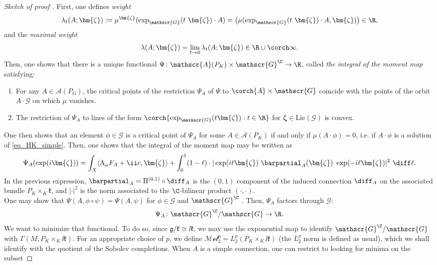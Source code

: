 {\begin{proof}[\textit{Sketch of proof} \parencite{i1999hitchin}]
    First, one defines \textit{weight} 
    \[
    \lambda_t(A; \bm{\zeta}):=\mu^{\bm{\zeta}}(\exp_{\mathscr{G}}(t\  \bm{\zeta})\cdot A)=\big(\mu(\exp_{\mathscr{G}}(t \ \bm{\zeta})\cdot A, \bm{\zeta}) \big) \in \R,
    \]
    and the \textit{maximal weight}
    \[
    \lambda(A; \bm{\zeta})=\lim_{t \to 0} \lambda_t(A; \bm{\zeta}) \in \R \cup \corch\infty.
    \]
    Then, one shows that there is a unique functional \(\Psi\colon \mathscr{A}(P_K) \times \mathscr{G}^\C \to \R\), called \textit{the integral of the moment map} satisfying:
    \begin{enumerate}
        \item For any \(A \in \mathscr{A}(P_G)\), the critical points of the restriction \(\Psi_A\) of \(\Psi\) to \(\corch{A} \times \mathscr{G}\) coincide with the points of the orbit \(A\cdot \mathscr{G}\) on which \(\mu\) vanishes.
        \item The restriction of \(\Psi_A\) to lines of the form \(\corch{\exp_{\mathscr{G}}(t\bm{\zeta}): t \in \R}\) for \(\bm{\zeta} \in \mathrm{Lie}(\mathscr{G})\) is convex.
    \end{enumerate}
    One then shows that an element \(\phi \in \mathscr{G}\) is a critical point of \(\Psi_A\) for some \(A \in \mathscr{A}(P_K)\) if and only if \(\mu(A \cdot \phi)=0\), i.e. if \(A \cdot \phi\) is a solution of \eqref{eq_HK_simple}. Then, one shows that the integral of the moment map may be written as
    \[
    \Psi_A(\exp(i\bm{\zeta}))=\int_X \langle \Lambda_\omega F_A+\ii c, \bm{\zeta}\rangle +\int_0^1(1-\ell)\cdot |\exp(i\ell \bm{\zeta})\ \barpartial_A(\bm{\zeta}) \ \exp(-i \ell \bm{\zeta})|^2 \ \diff \ell. 
    \]
    In the previous expression, \(\barpartial_A=\Pi^{(0,1)}\circ \diff_A\) is the \((0,1)\) component of the induced connection \(\diff_A\) on the associated bundle \(P_K \times_K \mathfrak{k}\), and \(|\cdot|^2\) is the norm associated to the \(\C\)-bilinear product \((\cdot, \cdot)\). \\
    One may show that \(\Psi(A, \phi \circ  \psi)=\Psi(A, \psi)\) for \(\phi \in \mathscr{G}\) and \(\mathscr{G}^\C\) \parencite[Prop. 3.4]{i1999hitchin}. Then, \(\Psi_A\) factors through \(\mathscr{G}\):
    \[
    \Psi_A\colon \mathscr{G}^\C/\mathscr{G} \to \R.
    \]
    We want to minimize that functional. To do so, since \(\mathfrak{g}/\mathfrak{k}\cong \ii \mathfrak{k}\), we may use the exponential map to identify \(\mathscr{G}^\C/\mathscr{G}\) with \(\Gamma(M;P_K \times_K \ii \mathfrak{k})\). For an appropriate choice of \(p\), we define \(\mathscr{Met}^p_2=L_2^p(P_K \times_K \ii \mathfrak{k})\) (the \(L_2^p\) norm is defined as usual), which we shall identify with the quotient of the Sobolev completions. When \(A\) is a simple connection, one can restrict to looking for minima on the subset

\end{proof}}
